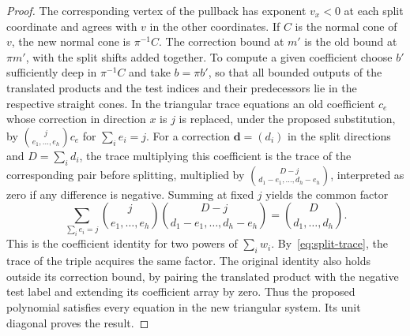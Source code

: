 \documentclass[11pt,reqno]{amsart}
\numberwithin{equation}{section}
\theoremstyle{definition}
\theoremstyle{remark}
\begin{document}
\begin{proof}
The corresponding vertex of the pullback has exponent \(v_x<0\) at
each split coordinate and agrees with \(v\) in the other coordinates.
If \(C\) is the normal cone of \(v\), the new normal cone is \(\pi^{-1}C\).
The correction bound at \(m'\) is the old bound at \(\pi m'\), with
the split shifts added together. To compute a given coefficient choose \(b'\)
sufficiently deep in \(\pi^{-1}C\) and take \(b=\pi b'\), so that
all bounded outputs of the translated products and the test indices
and their predecessors lie in the respective straight cones.
In the triangular trace equations an old coefficient \(c_e\)
whose correction in direction \(x\) is \(j\) is replaced, under the
proposed substitution, by
\(\binom{j}{e_1,\ldots,e_h}c_e\) for \(\sum_i e_i=j\).
For a correction \(\boldsymbol d=(d_i)\) in the split
directions and \(D=\sum_i d_i\), the trace multiplying this coefficient
is the trace of the corresponding pair before splitting, multiplied by
\(\binom{D-j}{d_1-e_1,\ldots,d_h-e_h}\), interpreted as zero if any
difference is negative. Summing at fixed \(j\) yields the common factor
\[ \sum_{\sum_i e_i=j} \binom{j}{e_1,\ldots,e_h} \binom{D-j}{d_1-e_1,\ldots,d_h-e_h} =\binom{D}{d_1,\ldots,d_h}. \]
This is the coefficient identity for two powers of \(\sum_i w_i\).
By~\eqref{eq:split-trace}, the trace of the triple acquires the same factor. The original identity also holds outside its correction bound, by
pairing the translated product with the negative test label and
extending its coefficient array by zero. Thus the proposed polynomial satisfies
every equation in the new triangular system. Its unit diagonal proves
the result.
\end{proof}
\end{document}
